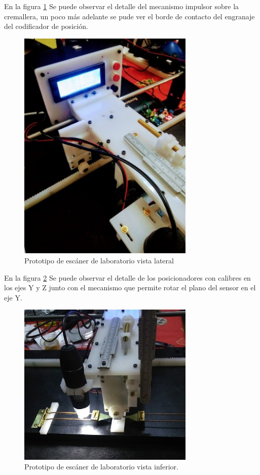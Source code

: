 En la figura \ref{fig:escanerLaboratorio02} Se puede observar el detalle del mecanismo impulsor sobre la cremallera, un poco más adelante se pude ver el borde de contacto del engranaje del codificador de posición.
\begin{figure}[H]
    \centering
    \includegraphics[width=0.75\textwidth]{./Figures/escanerLaboratorio02}
	\caption{Prototipo de escáner de laboratorio vista lateral}
	\label{fig:escanerLaboratorio02}
 \end{figure}

En la figura \ref{fig:escanerLaboratorio03} Se puede observar el detalle de los posicionadores con calibres en los ejes Y y Z junto con el mecanismo que permite rotar el plano del sensor en el eje Y.
\begin{figure}[H]
    \centering
    \includegraphics[width=0.75\textwidth]{./Figures/escanerLaboratorio03}
	\caption{Prototipo de escáner de laboratorio vista inferior.}
	\label{fig:escanerLaboratorio03}
 \end{figure}




